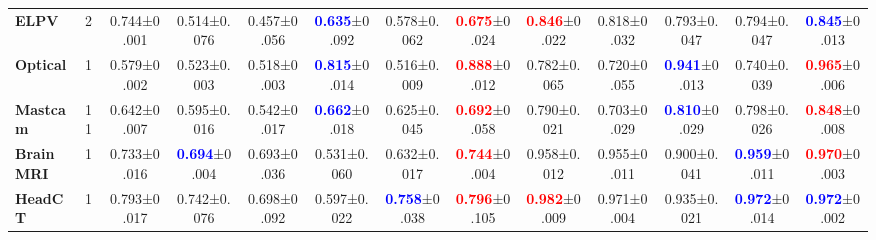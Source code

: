 \documentclass[10pt,twocolumn,letterpaper]{article}
\begin{document}
\begin{table*}[bt]
{\begin{tabular}{l@{}|c ||c||ccccc||ccccc}
    \textbf{ELPV} & 2 & 0.744\footnotesize{±0.001}& 0.514\footnotesize{±0.076}& 0.457\footnotesize{±0.056}& \textcolor{blue}{\textbf{0.635}}\footnotesize{±0.092}& 0.578\footnotesize{±0.062}& \textcolor{red}{\textbf{0.675}}\footnotesize{±0.024}& \textcolor{red}{\textbf{0.846}}\footnotesize{±0.022}& 0.818\footnotesize{±0.032}& 0.793\footnotesize{±0.047}& 0.794\footnotesize{±0.047}& \textcolor{blue}{\textbf{0.845}}\footnotesize{±0.013} \\
    
   \textbf{Optical}& 1 & 0.579\footnotesize{±0.002}& 0.523\footnotesize{±0.003}& 0.518\footnotesize{±0.003}& \textcolor{blue}{\textbf{0.815}}\footnotesize{±0.014}& 0.516\footnotesize{±0.009}& \textcolor{red}{\textbf{0.888}}\footnotesize{±0.012}& 0.782\footnotesize{±0.065}& 0.720\footnotesize{±0.055}& \textcolor{blue}{\textbf{0.941}}\footnotesize{±0.013}& 0.740\footnotesize{±0.039}& \textcolor{red}{\textbf{0.965}}\footnotesize{±0.006}\\
   
   \textbf{Mastcam}& 11& 0.642\footnotesize{±0.007}& 0.595\footnotesize{±0.016}& 0.542\footnotesize{±0.017}& \textcolor{blue}{\textbf{0.662}}\footnotesize{±0.018}& 0.625\footnotesize{±0.045}& \textcolor{red}{\textbf{0.692}}\footnotesize{±0.058}& 0.790\footnotesize{±0.021}& 0.703\footnotesize{±0.029}& \textcolor{blue}{\textbf{0.810}}\footnotesize{±0.029}& 0.798\footnotesize{±0.026}& \textcolor{red}{\textbf{0.848}}\footnotesize{±0.008}\\
   
    \textbf{BrainMRI}& 1 & 0.733\footnotesize{±0.016}& \textcolor{blue}{\textbf{0.694}}\footnotesize{±0.004}& 0.693\footnotesize{±0.036}& 0.531\footnotesize{±0.060}& 0.632\footnotesize{±0.017}& \textcolor{red}{\textbf{0.744}}\footnotesize{±0.004}& 0.958\footnotesize{±0.012}& 0.955\footnotesize{±0.011}& 0.900\footnotesize{±0.041}& \textcolor{blue}{\textbf{0.959}}\footnotesize{±0.011}& \textcolor{red}{\textbf{0.970}}\footnotesize{±0.003}\\
    
   \textbf{HeadCT}& 1 & 0.793\footnotesize{±0.017}& 0.742\footnotesize{±0.076}& 0.698\footnotesize{±0.092}& 0.597\footnotesize{±0.022}& \textcolor{blue}{\textbf{0.758}}\footnotesize{±0.038}& \textcolor{red}{\textbf{0.796}}\footnotesize{±0.105}& \textcolor{red}{\textbf{0.982}}\footnotesize{±0.009}& 0.971\footnotesize{±0.004}& 0.935\footnotesize{±0.021}& \textcolor{blue}{\textbf{0.972}}\footnotesize{±0.014}& \textcolor{blue}{\textbf{0.972}}\footnotesize{±0.002}\\
   

\end{tabular}}
\end{table*}
\end{document}
